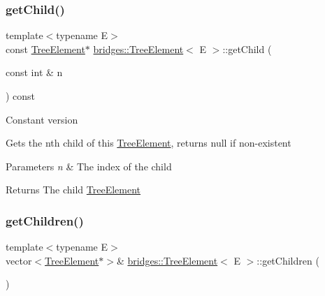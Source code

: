 \subsubsection{\texorpdfstring{get\+Child()}{getChild()}\hspace{0.1cm}{\footnotesize\ttfamily [2/2]}}
{\footnotesize\ttfamily template$<$typename E$>$ \\
const \hyperlink{classbridges_1_1_tree_element}{Tree\+Element}$\ast$ \hyperlink{classbridges_1_1_tree_element}{bridges\+::\+Tree\+Element}$<$ E $>$\+::get\+Child (\begin{DoxyParamCaption}\item[{const int \&}]{n }\end{DoxyParamCaption}) const\hspace{0.3cm}{\ttfamily [inline]}}

Constant version

Gets the nth child of this \hyperlink{classbridges_1_1_tree_element}{Tree\+Element}, returns null if non-\/existent


\begin{DoxyParams}{Parameters}
{\em n} & The index of the child \\
\hline
\end{DoxyParams}
\begin{DoxyReturn}{Returns}
The child \hyperlink{classbridges_1_1_tree_element}{Tree\+Element} 
\end{DoxyReturn}
\hypertarget{classbridges_1_1_tree_element_a52cb83546da21674d306cbb8026f89ac}{}\label{classbridges_1_1_tree_element_a52cb83546da21674d306cbb8026f89ac} 
\subsubsection{\texorpdfstring{get\+Children()}{getChildren()}\hspace{0.1cm}{\footnotesize\ttfamily [1/2]}}
{\footnotesize\ttfamily template$<$typename E$>$ \\
vector$<$\hyperlink{classbridges_1_1_tree_element}{Tree\+Element}$\ast$$>$\& \hyperlink{classbridges_1_1_tree_element}{bridges\+::\+Tree\+Element}$<$ E $>$\+::get\+Children (\begin{DoxyParamCaption}{ }\end{DoxyParamCaption})\hspace{0.3cm}{\ttfamily [inline]}}

